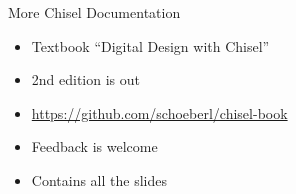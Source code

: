 \begin{frame}[fragile]{More Chisel Documentation}
\begin{itemize}
\item Textbook ``Digital Design with Chisel''
\item 2nd edition is out
\item \url{https://github.com/schoeberl/chisel-book}
\item Feedback is welcome
\item Contains all the slides
\end{itemize}
\end{frame}

%

